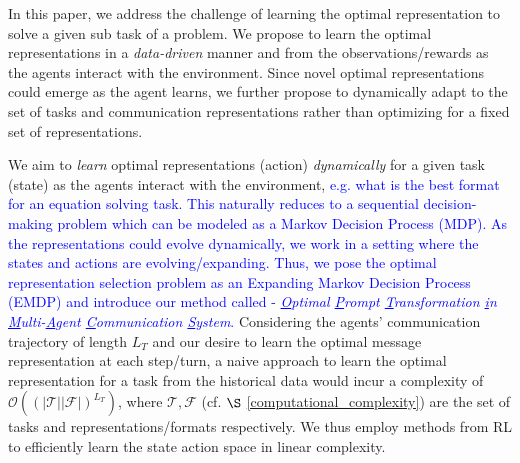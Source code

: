 
In this paper, we address the challenge of learning the optimal representation to solve a given sub task of a problem. We propose to learn the optimal representations in a \emph{data-driven} manner and from the observations/rewards as the agents interact with the environment. Since novel optimal representations could emerge as the agent learns, we further propose to dynamically adapt to the set of tasks and communication representations rather than optimizing for a fixed set of representations. 

We aim to \emph{learn} optimal representations (action) \emph{dynamically} for a given task (state) as the agents interact with the environment, \textcolor{blue}{e.g. what is the best format for an equation solving task. This naturally reduces to a sequential decision-making problem which can be modeled as a Markov Decision Process (MDP).
As the representations could evolve dynamically, we work in a setting where the states and actions are evolving/expanding. Thus, we pose the optimal representation selection problem as an Expanding
Markov Decision Process (EMDP) and introduce our method called \method - \emph{\underline{O}ptimal \underline{P}rompt \underline{T}ransformation \underline{i}n \underline{M}ulti-\underline{A}gent \underline{C}ommunication \underline{S}ystem}.} Considering the agents' communication trajectory of length $L_T$ and our desire to learn the optimal message representation at each step/turn, a naive approach to learn the optimal representation for a task from the historical data would incur a complexity of $\mathcal{O}((\lvert\mathcal{T}\lvert\lvert\mathcal{F}\lvert)^{L_T})$, where $\mathcal{T}, \mathcal{F}$ (cf. $\S$ \ref{computational_complexity}) are the set of tasks and representations/formats respectively. We thus employ methods from RL to efficiently learn the state action space in linear complexity. 


